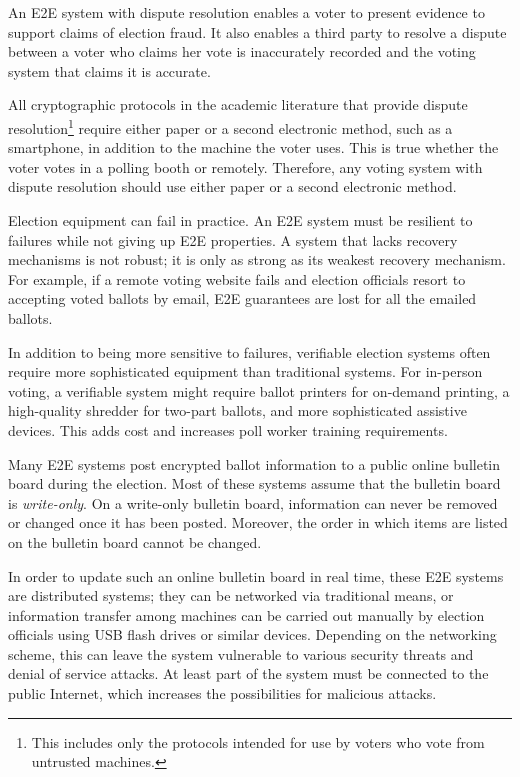 An E2E system with dispute resolution enables a voter to present
evidence to support claims of election fraud. It also enables a third
party to resolve a dispute between a voter who claims her vote is
inaccurately recorded and the voting system that claims it is accurate.

All cryptographic protocols in the academic literature that provide
dispute resolution\footnote{This includes only the protocols intended
  for use by voters who vote from untrusted machines.}  require either
paper or a second electronic method, such as a smartphone, in addition
to the machine the voter uses. This is true whether the voter votes in
a polling booth or remotely. Therefore, any voting system with dispute
resolution should use either paper or a second electronic method.


Election equipment can fail in practice. An E2E system must be
resilient to failures while not giving up E2E properties. A system
that lacks recovery mechanisms is not robust; it is only as strong as
its weakest recovery mechanism. For example, if a remote voting
website fails and election officials resort to accepting voted ballots
by email, E2E guarantees are lost for all the emailed ballots.

In addition to being more sensitive to failures, verifiable election
systems often require more sophisticated equipment than traditional
systems. For in-person voting, a verifiable system might require
ballot printers for on-demand printing, a high-quality shredder for
two-part ballots, and more sophisticated assistive devices. This adds
cost and increases poll worker training requirements.

Many E2E systems post encrypted ballot information to a public online
bulletin board during the election. Most of these systems assume that
the bulletin board is \emph{write-only}. On a write-only bulletin
board, information can never be removed or changed once it has been
posted. Moreover, the order in which items are listed on the bulletin
board cannot be changed.

In order to update such an online bulletin board in real time, these E2E
systems are distributed systems; they can be networked via traditional
means, or information transfer among machines can be carried out
manually by election officials using USB flash drives or similar
devices. Depending on the networking scheme, this can leave the system
vulnerable to various security threats and denial of service
attacks. At least part of the system must be connected to the public
Internet, which increases the possibilities for malicious attacks.

